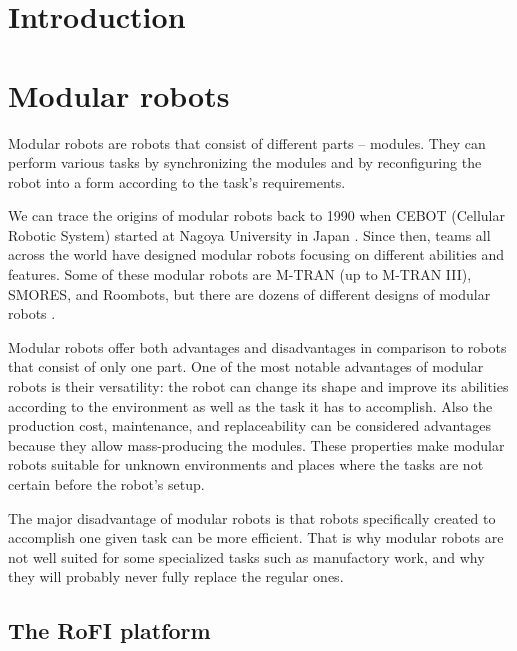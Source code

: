 \documentclass[
  digital, %
  table,   %
  oneside, %
  nolof,     %
  nolot,     %
]{fithesis3}
\begin{document}
\chapter{Introduction}



\chapter{Modular robots}

Modular robots are robots that consist of different parts -- modules.
They can perform various tasks by synchronizing the modules and by reconfiguring the robot into a form according to the task's requirements.

We can trace the origins of modular robots back to 1990 when CEBOT (Cellular Robotic System) started at Nagoya University in Japan \cite{current-trends}.
Since then, teams all across the world have designed modular robots focusing on different abilities and features.
Some of these modular robots are M-TRAN (up to M-TRAN III)\cite{mtran}, SMORES\cite{smores}, and Roombots\cite{roombots}, but there are dozens of different designs of modular robots \cite{current-trends}.

Modular robots offer both advantages and disadvantages in comparison to robots that consist of only one part.
One of the most notable advantages of modular robots is their versatility: the robot can change its shape and improve its abilities according to the environment as well as the task it has to accomplish.
Also the production cost, maintenance, and replaceability can be considered advantages because they allow mass-producing the modules.
These properties make modular robots suitable for unknown environments and places where the tasks are not certain before the robot's setup.

The major disadvantage of modular robots is that robots specifically created to accomplish one given task can be more efficient.
That is why modular robots are not well suited for some specialized tasks such as manufactory work, and why they will probably never fully replace the regular ones.

\section{The RoFI platform}
\end{document}
